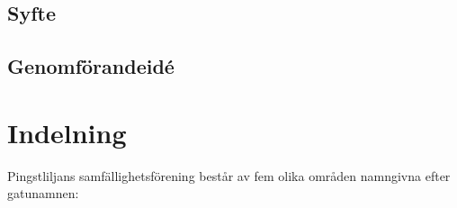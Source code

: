 \documentclass[12pt,a4paper]{article}
\begin{document}
\subsection{Syfte}

\subsection{Genomförandeidé} 







\section{Indelning}
Pingstliljans samfällighetsförening består av fem olika områden namngivna efter gatunamnen: 
\end{document}
